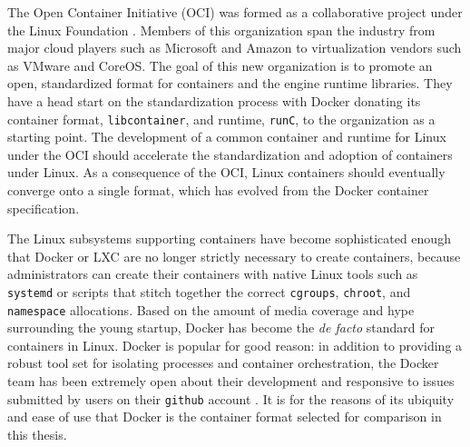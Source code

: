 The Open Container Initiative (OCI) was formed as a collaborative project under the Linux Foundation \autocite{_oci_1}.
Members of this organization span the industry from major cloud players such as Microsoft and Amazon to virtualization vendors such as VMware and CoreOS.  
The goal of this new organization is to promote an open, standardized format for containers and the engine runtime libraries. 
They have a head start on the standardization process with Docker donating its container format, \texttt{libcontainer}, and runtime, \texttt{runC}, to the organization as a starting point.
The development of a common container and runtime for Linux under the OCI should accelerate the standardization and adoption of containers under Linux.
As a consequence of the OCI, Linux containers should eventually converge onto a single format, which has evolved from the Docker container specification.   

The Linux subsystems supporting containers have become sophisticated enough that Docker or LXC are no longer strictly necessary to create containers, because administrators can create their containers with native Linux  tools such as \texttt{systemd} or scripts that stitch together the correct \texttt{cgroups}, \texttt{chroot}, and \texttt{namespace} allocations. 
Based on the amount of media coverage and hype surrounding the young startup, Docker has become the \emph{de facto} standard for containers in Linux.  
Docker is popular for good reason: in addition to providing a robust tool set for isolating processes and container orchestration, the Docker team has been extremely open about their development and responsive to issues submitted by users on their \texttt{github} account \autocite{githubdocker}.  
It is for the reasons of its ubiquity and ease of use that Docker is the container format selected for comparison in this thesis.


